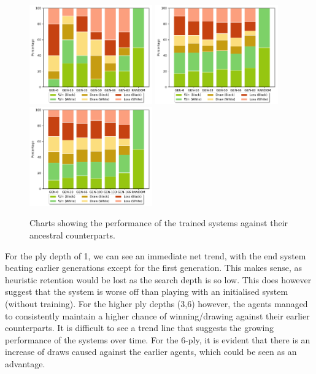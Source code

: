 \documentclass[12pt,a4paper]{article}
\begin{document}
    \begin{figure}[!ht]
        \centering
        \includegraphics[width=53mm]{images/results/1ply/gm_net_stats.pdf}
        \includegraphics[width=53mm]{images/results/3ply/gm_net_stats.pdf}
        \includegraphics[width=53mm]{images/results/6ply/gm_net_stats.pdf}
        \caption{Charts showing the performance of the trained systems against their ancestral counterparts.\label{net_stats}}
    \end{figure}
    
    For the ply depth of 1, we can see an immediate net trend, with the end system beating earlier generations except for the first generation. 
    This makes sense, as heuristic retention would be lost as the search depth is so low. This does however suggest that the system is worse off than playing with an initialised system (without training). For the higher ply depths (3,6) however, the agents managed to consistently maintain a higher chance of winning/drawing against their earlier counterparts. It is difficult to see a trend line that suggests the growing performance of the systems over time. For the 6-ply, it is evident that there is an increase of draws caused against the earlier agents, which could be seen as an advantage. 
\end{document}
